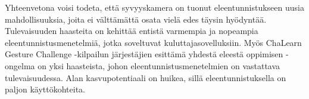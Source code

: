 Yhteenvetona voisi todeta, että syvyyskamera on tuonut eleentunnistukseen uusia mahdollisuuksia, joita ei välttämättä osata vielä edes täysin hyödyntää.
Tulevaisuuden haasteita on kehittää entistä varmempia ja nopeampia eleentunnistusmenetelmiä, jotka soveltuvat kuluttajasovelluksiin.
Myös ChaLearn Gesture Challenge -kilpailun järjestäjien esittämä yhdestä eleestä oppimisen -ongelma on yksi haasteista, johon eleentunnistusmenetelmien on 
vastattava tulevaisuudessa. Alan kasvupotentiaali on huikea, sillä eleentunnistuksella on paljon käyttökohteita. \\








